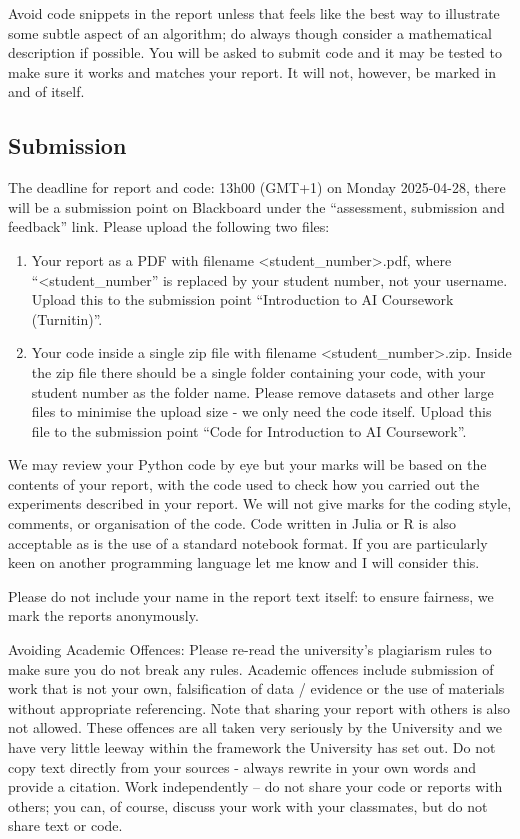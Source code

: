 \documentclass[12pt]{article}
\begin{document}
Avoid code snippets in the report unless that feels like the best way
to illustrate some subtle aspect of an algorithm; do always though
consider a mathematical description if possible. You will be asked to
submit code and it may be tested to make sure it works and matches
your report. It will not, however, be marked in and of itself.

\subsection*{Submission}

The deadline for report and code: 13h00 (GMT+1) on Monday 2025-04-28, there
will be a submission point on Blackboard under the ``assessment,
submission and feedback'' link. Please upload the following two files:
\begin{enumerate}
\item Your report as a PDF with filename <student\_number>.pdf, where
  ``<student\_number'' is replaced by your student number, not your
  username. Upload this to the submission point ``Introduction to AI
  Coursework (Turnitin)''.
\item Your code inside a single zip file with filename
  <student\_number>.zip. Inside the zip file there should be a single
  folder containing your code, with your student number as the folder
  name. Please remove datasets and other large files to minimise the
  upload size - we only need the code itself. Upload this file to the
  submission point ``Code for Introduction to AI Coursework''.
\end{enumerate}
  
We may review your Python code by eye but your marks will be based on
the contents of your report, with the code used to check how you
carried out the experiments described in your report. We will not give
marks for the coding style, comments, or organisation of the
code. Code written in Julia or R is also acceptable as is the use of a
standard notebook format. If you are particularly keen on another
programming language let me know and I will consider this.

Please do not include your name in the report text itself: to ensure
fairness, we mark the reports anonymously.

Avoiding Academic Offences: Please re-read the university's plagiarism
rules to make sure you do not break any rules. Academic offences
include submission of work that is not your own, falsification of data
/ evidence or the use of materials without appropriate
referencing. Note that sharing your report with others is also not
allowed. These offences are all taken very seriously by the University
and we have very little leeway within the framework the University has
set out. Do not copy text directly from your sources - always rewrite
in your own words and provide a citation. Work independently -- do not
share your code or reports with others; you can, of course, discuss
your work with your classmates, but do not share text or code.
\end{document}
